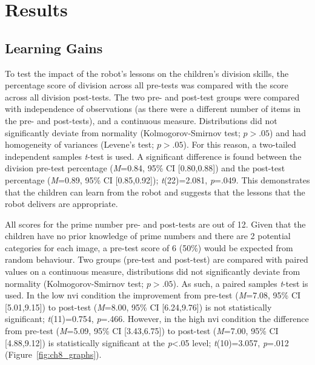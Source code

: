 \section{Results}\label{sec:nviprimes-results}
\subsection{Learning Gains}
To test the impact of the robot's lessons on the children's division skills, the percentage score of division across all pre-tests was compared with the score across all division post-tests. The two pre- and post-test groups were compared with independence of observations (as there were a different number of items in the pre- and post-tests), and a continuous measure. Distributions did not significantly deviate from normality (Kolmogorov-Smirnov test; $\textit{p}>.05$) and had homogeneity of variances (Levene's test; $\textit{p}>.05$). For this reason, a two-tailed independent samples \textit{t}-test is used. A significant difference is found between the division pre-test percentage (\textit{M}=0.84, 95\% CI [0.80,0.88]) and the post-test percentage (\textit{M}=0.89, 95\% CI [0.85,0.92]); \textit{t}(22)=2.081, \textit{p}=.049. This demonstrates that the children can learn from the robot and suggests that the lessons that the robot delivers are appropriate.

All scores for the prime number pre- and post-tests are out of 12. Given that the children have no prior knowledge of prime numbers and there are 2 potential categories for each image, a pre-test score of 6 (50\%) would be expected from random behaviour. Two groups (pre-test and post-test) are compared with paired values on a continuous measure, distributions did not significantly deviate from normality (Kolmogorov-Smirnov test; $\textit{p}>.05$). As such, a paired samples \textit{t}-test is used. In the low \acrshort{nvi} condition the improvement from pre-test (\textit{M}=7.08, 95\% CI [5.01,9.15]) to post-test (\textit{M}=8.00, 95\% CI [6.24,9.76]) is not statistically significant; \textit{t}(11)=0.754, \textit{p}=.466. However, in the high \acrshort{nvi} condition the difference from pre-test (\textit{M}=5.09, 95\% CI [3.43,6.75]) to post-test (\textit{M}=7.00, 95\% CI [4.88,9.12]) is statistically significant at the \textit{p}\textless .05 level; \textit{t}(10)=3.057, \textit{p}=.012 (Figure~\ref{fig:ch8_graphs}).

